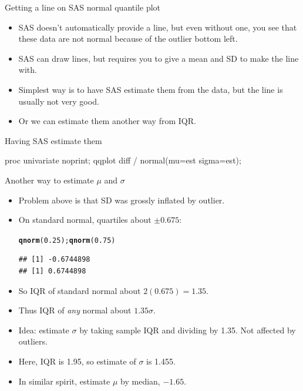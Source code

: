 \documentclass[unknownkeysallowed]{beamer}\usepackage[]{graphicx}\usepackage[]{color}
\makeatletter
\newcommand{\hlnum}[1]{\textcolor[rgb]{0.686,0.059,0.569}{#1}}%
\newcommand{\hlstd}[1]{\textcolor[rgb]{0.345,0.345,0.345}{#1}}%
\newcommand{\hlkwd}[1]{\textcolor[rgb]{0.737,0.353,0.396}{\textbf{#1}}}%
\newenvironment{kframe}{%
 \def\at@end@of@kframe{}%
 \ifinner\ifhmode%
  \def\at@end@of@kframe{\end{minipage}}%
  \begin{minipage}{\columnwidth}%
 \fi\fi%
 \def\FrameCommand##1{\hskip\@totalleftmargin \hskip-\fboxsep
 \colorbox{shadecolor}{##1}\hskip-\fboxsep
     \hskip-\linewidth \hskip-\@totalleftmargin \hskip\columnwidth}%
 \MakeFramed {\advance\hsize-\width
   \@totalleftmargin\z@ \linewidth\hsize
   \@setminipage}}%
 {\par\unskip\endMakeFramed%
 \at@end@of@kframe}
\newenvironment{knitrout}{}{} %
\makeatother
\begin{document}
\begin{frame}[fragile]{Getting a line on SAS normal quantile plot}

  \begin{itemize}
  \item SAS doesn't automatically provide a line, but even without
    one, you see that these data are not normal because of the outlier
    bottom left.
  \item SAS can draw lines, but requires you to give a mean and SD to
    make the line with.
  \item Simplest way is to have SAS estimate them from the data, but
    the line is usually not very good.
  \item Or we can estimate them another way from IQR.
  \end{itemize}
  
\end{frame}

\begin{frame}[fragile]{Having SAS estimate them}

\begin{Sascode}[store=if]
  proc univariate noprint;
    qqplot diff / normal(mu=est sigma=est);
\end{Sascode}

  
\end{frame}

\begin{frame}[fragile]{Another way to estimate $\mu$ and $\sigma$}

  \begin{itemize}
  \item Problem above is that SD was grossly inflated by outlier.
  \item On standard normal, quartiles about $\pm 0.675$:
\begin{knitrout}
\color{fgcolor}\begin{kframe}
\begin{alltt}
\hlkwd{qnorm}\hlstd{(}\hlnum{0.25}\hlstd{);} \hlkwd{qnorm}\hlstd{(}\hlnum{0.75}\hlstd{)}
\end{alltt}
\begin{verbatim}
## [1] -0.6744898
## [1] 0.6744898
\end{verbatim}
\end{kframe}
\end{knitrout}
\item So IQR of standard normal about $2(0.675)=1.35$.
\item Thus IQR of \emph{any} normal about $1.35\sigma$.
\item Idea: estimate $\sigma$ by taking sample IQR and dividing by
  1.35. Not affected by outliers.
\item Here, IQR is 1.95,
so estimate of $\sigma$ is 1.455.
\item  In similar spirit, estimate $\mu$ by median, $-1.65$.
  \end{itemize} 
  
\end{frame}
\end{document}
